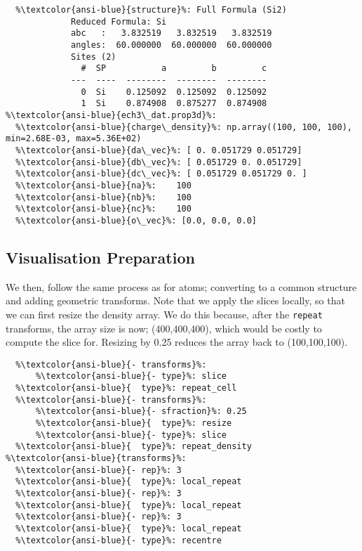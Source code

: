 \documentclass[10pt,parskip=half,
	toc=sectionentrywithdots,
	bibliography=totocnumbered,
	captions=tableheading,numbers=noendperiod]{scrartcl}
\begin{document}
\begin{lstlisting}[language={},postbreak={},numbers=none,xrightmargin=7pt,belowskip=5pt,aboveskip=5pt,breakindent=0pt,escapechar=\%]
%\textcolor{ansi-blue}{ech3.out}%: 
  %\textcolor{ansi-blue}{structure}%: Full Formula (Si2)
             Reduced Formula: Si
             abc   :   3.832519   3.832519   3.832519
             angles:  60.000000  60.000000  60.000000
             Sites (2)
               #  SP           a         b         c
             ---  ----  --------  --------  --------
               0  Si    0.125092  0.125092  0.125092
               1  Si    0.874908  0.875277  0.874908
%\textcolor{ansi-blue}{ech3\_dat.prop3d}%: 
  %\textcolor{ansi-blue}{charge\_density}%: np.array((100, 100, 100), min=2.68E-03, max=5.36E+02)
  %\textcolor{ansi-blue}{da\_vec}%: [ 0. 0.051729 0.051729]
  %\textcolor{ansi-blue}{db\_vec}%: [ 0.051729 0. 0.051729]
  %\textcolor{ansi-blue}{dc\_vec}%: [ 0.051729 0.051729 0. ]
  %\textcolor{ansi-blue}{na}%:    100
  %\textcolor{ansi-blue}{nb}%:    100
  %\textcolor{ansi-blue}{nc}%:    100
  %\textcolor{ansi-blue}{o\_vec}%: [0.0, 0.0, 0.0]

\end{lstlisting}

\subsection{Visualisation Preparation}\label{visualisation-preparation}

We then, follow the same process as for atoms; converting to a common
structure and adding geometric transforms. Note that we apply the slices
locally, so that we can first resize the density array. We do this
because, after the \texttt{repeat} transforms, the array size is now;
(400,400,400), which would be costly to compute the slice for. Resizing
by 0.25 reduces the array back to (100,100,100).

\begin{lstlisting}[language={},postbreak={},numbers=none,xrightmargin=7pt,belowskip=5pt,aboveskip=5pt,breakindent=0pt,escapechar=\%]
%\textcolor{ansi-blue}{elements}%: 
  %\textcolor{ansi-blue}{- transforms}%: 
      %\textcolor{ansi-blue}{- type}%: slice
  %\textcolor{ansi-blue}{  type}%: repeat_cell
  %\textcolor{ansi-blue}{- transforms}%: 
      %\textcolor{ansi-blue}{- sfraction}%: 0.25
      %\textcolor{ansi-blue}{  type}%: resize
      %\textcolor{ansi-blue}{- type}%: slice
  %\textcolor{ansi-blue}{  type}%: repeat_density
%\textcolor{ansi-blue}{transforms}%: 
  %\textcolor{ansi-blue}{- rep}%: 3
  %\textcolor{ansi-blue}{  type}%: local_repeat
  %\textcolor{ansi-blue}{- rep}%: 3
  %\textcolor{ansi-blue}{  type}%: local_repeat
  %\textcolor{ansi-blue}{- rep}%: 3
  %\textcolor{ansi-blue}{  type}%: local_repeat
  %\textcolor{ansi-blue}{- type}%: recentre

\end{lstlisting}
\end{document}
